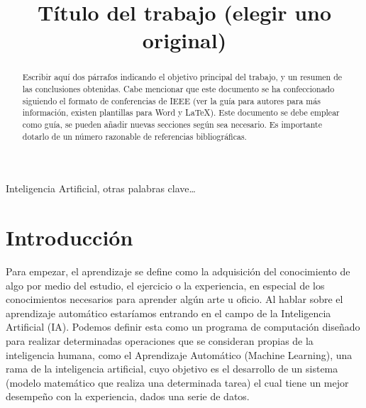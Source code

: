 \documentclass[conference,a4paper]{IEEEtran}
\begin{document}
\title{Título del trabajo (elegir uno original)}

\author{
  
  \and
  
}

\maketitle


\begin{abstract}
  Escribir aquí dos párrafos indicando el objetivo principal del trabajo, y un
  resumen de las conclusiones obtenidas. Cabe mencionar que este documento se
  ha confeccionado siguiendo el formato de conferencias de IEEE (ver la guía
  para autores para más información, existen plantillas para Word y \LaTeX).
  Este documento se debe emplear como guía, se pueden añadir nuevas secciones
  según sea necesario. Es importante dotarlo de un número razonable de
  referencias bibliográficas.
\end{abstract}


\begin{IEEEkeywords}
  Inteligencia Artificial, otras palabras clave…
\end{IEEEkeywords}


\section{Introducción}


Para empezar, el aprendizaje se define como la adquisición del conocimiento de algo por medio del estudio, el ejercicio o la experiencia, en especial de los conocimientos necesarios para aprender algún arte u oficio. Al hablar sobre el aprendizaje automático estaríamos entrando en el campo de la Inteligencia Artificial (IA). Podemos definir esta como un programa de computación diseñado para realizar determinadas operaciones que se consideran propias de la inteligencia humana, como el Aprendizaje Automático (Machine Learning), una rama de la inteligencia artificial, cuyo objetivo es el desarrollo de un sistema (modelo matemático que realiza una determinada tarea)  el cual tiene un mejor desempeño con la experiencia, dados una serie de datos.
\end{document}

